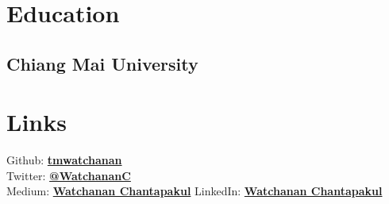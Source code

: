 \documentclass[]{deedy-resume-openfont}
\begin{document}
%
%
\lastupdated

%
%

%
%

\begin{minipage}[t]{0.33\textwidth} 


\section{Education} 


\subsection{Chiang Mai University}
\sectionsep


\section{Links} 
Github: \href{https://github.com/tmwatchanan}{\bf tmwatchanan} \\
Twitter: \href{https://twitter.com/watchananc}{\bf @WatchananC} \\
Medium: \href{https://medium.com/@watchanan}{\bf Watchanan Chantapakul}
LinkedIn: \href{https://www.linkedin.com/in/watchanan}{\bf Watchanan Chantapakul} \\


\end{minipage}
\end{document}

